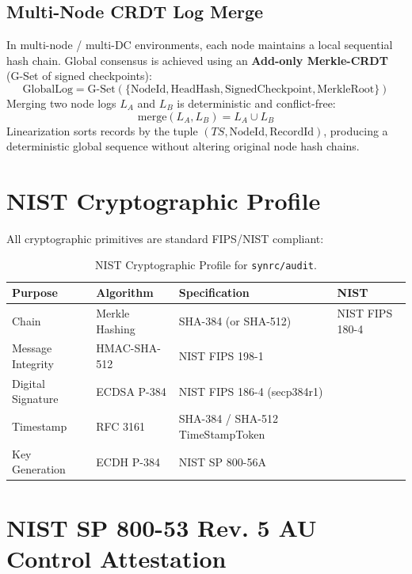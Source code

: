 \documentclass{article}
\begin{document}
\subsection{Multi-Node CRDT Log Merge}
In multi-node / multi-DC environments, each node maintains a local sequential hash chain. Global consensus is achieved using an \textbf{Add-only Merkle-CRDT} (G-Set of signed checkpoints):
\begin{equation}
\text{GlobalLog} = \text{G-Set}\left( \{ \text{NodeId}, \text{HeadHash}, \text{SignedCheckpoint}, \text{MerkleRoot} \} \right)
\end{equation}
Merging two node logs $L_A$ and $L_B$ is deterministic and conflict-free:
\begin{equation}
\text{merge}(L_A, L_B) = L_A \cup L_B
\end{equation}
Linearization sorts records by the tuple $(TS, \text{NodeId}, \text{RecordId})$, producing a deterministic global sequence without altering original node hash chains.

\section{NIST Cryptographic Profile}
All cryptographic primitives are standard FIPS/NIST compliant:
\begin{table}[h!]
\centering
\begin{tabular}{llll}
\toprule
\textbf{Purpose} & \textbf{Algorithm} & \textbf{Specification}  & \textbf{NIST} \\
\midrule
Chain & Merkle Hashing & SHA-384 (or SHA-512) & NIST FIPS 180-4 \\
Message Integrity & HMAC-SHA-512 & NIST FIPS 198-1 \\
Digital Signature & ECDSA P-384 & NIST FIPS 186-4 (secp384r1) \\
Timestamp & RFC 3161 & SHA-384 / SHA-512 TimeStampToken \\
Key Generation & ECDH P-384 & NIST SP 800-56A \\
\bottomrule
\end{tabular}
\caption{NIST Cryptographic Profile for \texttt{synrc/audit}.}
\end{table}

\section{NIST SP 800-53 Rev. 5 AU Control Attestation}
\end{document}
